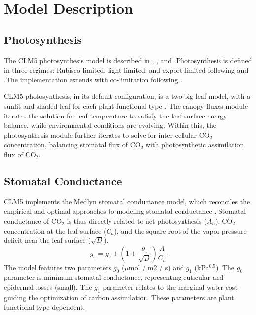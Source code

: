 \documentclass[draft,linenumbers]{agujournal}
\begin{document}
\section{Model Description}

\subsection{Photosynthesis}
\label{sect:A}
    The CLM5 photosynthesis model is described in \citet{bonan2011}, \citet{thornton2007},
    and \citet{oleson2013}.Photosynthesis is defined in three regimes: Rubisco-limited, light-limited, and export-limited 
    following \citet{farquhar1980} and \citet{harley1992}.The implementation extends \citet{sellers1996a,sellers1996b} with 
    co-limitation following \citet{collatz1991}. 
    
    CLM5 photosynthesis, in its default configuration, is a two-big-leaf model, with a sunlit and shaded leaf for each plant functional type \citep{thornton2007, dai2004, oleson2013}. 
    The canopy fluxes module iterates the solution for leaf temperature to satisfy the leaf surface energy balance, while environmental conditions are evolving.
    Within this, the photosynthesis module further iterates to solve for inter-cellular CO$_2$ concentration, balancing stomatal flux of 
    CO$_2$ with photosynthetic assimilation flux of CO$_2$.
    

\subsection{Stomatal Conductance}
\label{sect:gs}
    CLM5 implements the Medlyn stomatal conductance model, which reconciles the empirical and optimal approaches to modeling 
    stomatal conductance \citep{medlyn2011}. 
    Stomatal conductance of CO$_2$ is thus directly related to net photosynthesis ($A_n$), CO$_2$ concentration at the leaf surface 
    ($C_a$), and the square root of the vapor pressure deficit near the leaf surface ($\sqrt{D}$).
    \begin{equation}
    g_s=g_0+\left(1+\dfrac{g_1}{\sqrt{D}}\right)\dfrac{A}{C_a}
    \end{equation}
    The model features two parameters $g_0$ ($\mu$mol / m2 / s) and $g_1$ (kPa$^{0.5}$). 
    The $g_0$ parameter is minimum stomatal conductance, representing cuticular and epidermal losses (small). 
    The $g_1$ parameter relates to the marginal water cost guiding the optimization of carbon assimilation. These parameters are plant functional type dependent.
    
\end{document}
